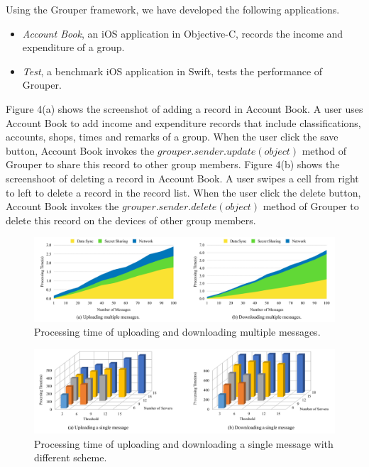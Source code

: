 \documentclass[twocolumn,10pt]{article}
\begin{document}
Using the Grouper framework, we have developed the following applications. 

\begin{itemize}
	\setlength{\itemsep}{1pt}
	\setlength{\parskip}{0pt}
	\setlength{\parsep}{0pt}
	\item \emph{Account Book}, an iOS application in Objective-C, records the income and expenditure of a group.
	\item \emph{Test}, a benchmark iOS application in Swift, tests the performance of Grouper.
\end{itemize}

Figure 4(a) shows the screenshot of adding a record in Account Book. 
A user uses Account Book to add income and expenditure records that include classifications, accounts, shops, times and remarks of a group. 
When the user click the save button, Account Book invokes the $grouper.sender.update(object)$ method of Grouper to share this record to other group members.
Figure 4(b) shows the screenshoot of deleting a record in Account Book. 
A user swipes a cell from right to left to delete a record in the record list. 
When the user click the delete button, Account Book invokes the $grouper.sender.delete(object)$ method of Grouper to delete this record on the devices of other group members.

\begin{figure}[t]
	\centering
	\includegraphics[scale=0.13]{multiple_messages}
	\caption{Processing time of uploading and downloading multiple messages.}
\end{figure}

\begin{figure}[t]
	\centering
	\includegraphics[scale=0.35]{3d}
	\caption{Processing time of uploading and downloading a single message with different scheme.}
\end{figure}
\end{document}
